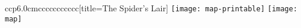\begin{figure*}[t]
    \begin{ornamentedtabular}{ccp{6.0cm}ccccccccccc}[title={The Spider's Lair}]
    \ifrpgprint
        \texttt{[image: map-printable]}
    \else
        \texttt{[image: map]}
    \fi
    \end{ornamentedtabular}
\end{figure*}
